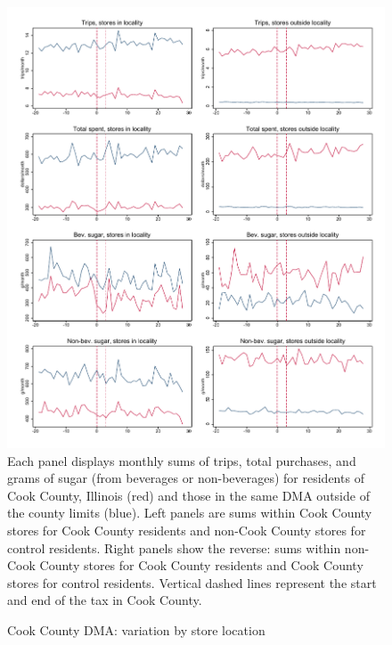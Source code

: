 \documentclass[12pt]{article}
\begin{document}
\clearpage
\begin{figure}[t]
\begin{center}
\caption{Cook County DMA: variation by store location}
\label{cook_panelist_stores}
\includegraphics[width=1\textwidth, angle=0]{../figures/panelist_cook_stores.pdf}
\footnotesize Each panel displays monthly sums of trips, total purchases, and grams of sugar (from beverages or non-beverages) for residents of Cook County, Illinois (red) and those in the same DMA outside of the county limits (blue). Left panels are sums within Cook County stores for Cook County residents and non-Cook County stores for control residents. Right panels show the reverse: sums within non-Cook County stores for Cook County residents and Cook County stores for control residents. Vertical dashed lines represent the start and end of the tax in Cook County.
\end{center}
\end{figure}
\end{document}
